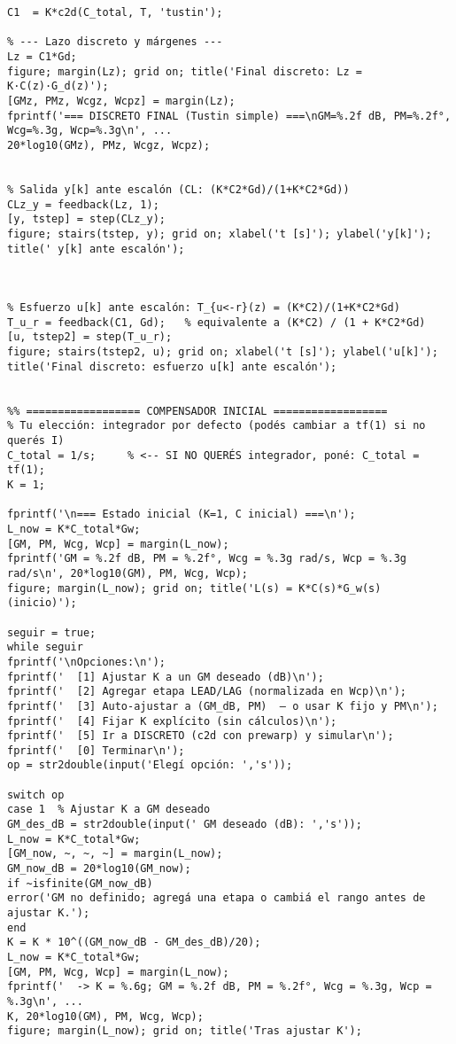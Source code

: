 \begin{lstlisting}[style=matlabstyle,caption={Hoja cálculos utilizada para el diseño de los compensadores.},label={matlab:hojaDeCalculos}]
% --- Discretizar el compensador (Tustin “normal”, sin prewarp) ---
C1  = K*c2d(C_total, T, 'tustin');

% --- Lazo discreto y márgenes ---
Lz = C1*Gd;
figure; margin(Lz); grid on; title('Final discreto: Lz = K·C(z)·G_d(z)');
[GMz, PMz, Wcgz, Wcpz] = margin(Lz);
fprintf('=== DISCRETO FINAL (Tustin simple) ===\nGM=%.2f dB, PM=%.2f°, Wcg=%.3g, Wcp=%.3g\n', ...
20*log10(GMz), PMz, Wcgz, Wcpz);


% Salida y[k] ante escalón (CL: (K*C2*Gd)/(1+K*C2*Gd))
CLz_y = feedback(Lz, 1);
[y, tstep] = step(CLz_y);
figure; stairs(tstep, y); grid on; xlabel('t [s]'); ylabel('y[k]');
title(' y[k] ante escalón');



% Esfuerzo u[k] ante escalón: T_{u<-r}(z) = (K*C2)/(1+K*C2*Gd)
T_u_r = feedback(C1, Gd);   % equivalente a (K*C2) / (1 + K*C2*Gd)
[u, tstep2] = step(T_u_r);
figure; stairs(tstep2, u); grid on; xlabel('t [s]'); ylabel('u[k]');
title('Final discreto: esfuerzo u[k] ante escalón');


%% ================== COMPENSADOR INICIAL ==================
% Tu elección: integrador por defecto (podés cambiar a tf(1) si no querés I)
C_total = 1/s;     % <-- SI NO QUERÉS integrador, poné: C_total = tf(1);
K = 1;

fprintf('\n=== Estado inicial (K=1, C inicial) ===\n');
L_now = K*C_total*Gw;
[GM, PM, Wcg, Wcp] = margin(L_now);
fprintf('GM = %.2f dB, PM = %.2f°, Wcg = %.3g rad/s, Wcp = %.3g rad/s\n', 20*log10(GM), PM, Wcg, Wcp);
figure; margin(L_now); grid on; title('L(s) = K*C(s)*G_w(s)  (inicio)');

seguir = true;
while seguir
fprintf('\nOpciones:\n');
fprintf('  [1] Ajustar K a un GM deseado (dB)\n');
fprintf('  [2] Agregar etapa LEAD/LAG (normalizada en Wcp)\n');
fprintf('  [3] Auto-ajustar a (GM_dB, PM)  — o usar K fijo y PM\n');
fprintf('  [4] Fijar K explícito (sin cálculos)\n');
fprintf('  [5] Ir a DISCRETO (c2d con prewarp) y simular\n');
fprintf('  [0] Terminar\n');
op = str2double(input('Elegí opción: ','s'));

switch op
case 1  % Ajustar K a GM deseado
GM_des_dB = str2double(input(' GM deseado (dB): ','s'));
L_now = K*C_total*Gw;
[GM_now, ~, ~, ~] = margin(L_now);
GM_now_dB = 20*log10(GM_now);
if ~isfinite(GM_now_dB)
error('GM no definido; agregá una etapa o cambiá el rango antes de ajustar K.');
end
K = K * 10^((GM_now_dB - GM_des_dB)/20);
L_now = K*C_total*Gw;
[GM, PM, Wcg, Wcp] = margin(L_now);
fprintf('  -> K = %.6g; GM = %.2f dB, PM = %.2f°, Wcg = %.3g, Wcp = %.3g\n', ...
K, 20*log10(GM), PM, Wcg, Wcp);
figure; margin(L_now); grid on; title('Tras ajustar K');


\end{lstlisting}
